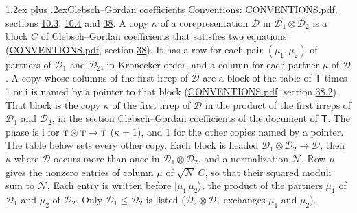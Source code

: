 \documentclass[10pt,a4paper]{article}
\makeatletter
\renewcommand\section{\@startsection{section}{1}{\z@}{-3ex plus -1ex minus -.2ex}%
  {1.2ex plus .2ex}{\normalfont\large\sffamily\bfseries\color{parttitle}}}
\numberwithin{equation}{section}
\newcommand{\grp}[1]{\mathsf{#1}}
\newcommand{\irr}[1]{\text{\normalfont\scshape #1}}
\newcommand{\iunit}{\mathrm{i}}
\newcommand{\irrprod}{\otimes}
\newcommand{\mult}{\kappa}
\newcommand{\intx}{\mu}
\newcommand{\cgnorm}{\mathcal{N}}
\newcommand{\prodket}[2]{\lvert {#1}\,{#2}\rangle}
\makeatother
\begin{document}
\section{Clebsch--Gordan coefficients}\label{s:clebsch_gordan}
Conventions: \href{../../CONVENTIONS.pdf}{CONVENTIONS.pdf}, sections \href{../../../rotation/CONVENTIONS.pdf\#conv.10.3}{10.3}, \href{../../../rotation/CONVENTIONS.pdf\#conv.10.4}{10.4} and \href{../../CONVENTIONS.pdf\#conv.38}{38}.
\leavevmode\label{n:index.copy}\label{n:matrix.cg.stored}A copy $\mult$ of a corepresentation $\mathcal{D}$ in $\mathcal{D}_1\irrprod\mathcal{D}_2$ is a block $C$ of Clebsch--Gordan coefficients that satisfies two equations (\href{../../CONVENTIONS.pdf}{CONVENTIONS.pdf}, section \href{../../CONVENTIONS.pdf\#conv.38}{38}). \label{n:index.cg}It has a row for each pair $(\intx_1, \intx_2)$ of partners of $\mathcal{D}_1$ and $\mathcal{D}_2$, in Kronecker order, and a column for each partner $\intx$ of $\mathcal{D}$.
A copy whose columns of the first irrep of $\mathcal{D}$ are a block of the table of $\grp{T}$ times 1 or $\iunit$ is named by a pointer to that block (\href{../../CONVENTIONS.pdf}{CONVENTIONS.pdf}, section \href{../../CONVENTIONS.pdf\#conv.38.2}{38.2}). That block is the copy $\mult$ of the first irrep of $\mathcal{D}$ in the product of the first irreps of $\mathcal{D}_1$ and $\mathcal{D}_2$, in the section Clebsch--Gordan coefficients of the document of \href{../../../rotation/data/pdf/T.pdf}{$\grp{T}$}. The phase is $\iunit$ for $\irr{t}\irrprod \irr{t}\to \irr{t}$ ($\mult = 1$), and 1 for the other copies named by a pointer. The table below sets every other copy.
Each block is headed $\mathcal{D}_1\irrprod\mathcal{D}_2\to\mathcal{D}$, then $\mult$ where $\mathcal{D}$ occurs more than once in $\mathcal{D}_1\irrprod\mathcal{D}_2$, and a normalization $\cgnorm$. Row $\intx$ gives the nonzero entries of column $\intx$ of $\sqrt{\cgnorm}\,C$, so that their squared moduli sum to $\cgnorm$. \label{n:vector.ket.product}Each entry is written before $\prodket{\intx_1}{\intx_2}$, the product of the partners $\intx_1$ of $\mathcal{D}_1$ and $\intx_2$ of $\mathcal{D}_2$. Only $\mathcal{D}_1 \le \mathcal{D}_2$ is listed ($\mathcal{D}_2\irrprod\mathcal{D}_1$ exchanges $\intx_1$ and $\intx_2$).
\end{document}
